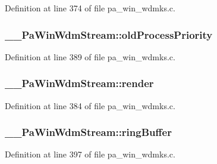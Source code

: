 Definition at line 374 of file pa\+\_\+win\+\_\+wdmks.\+c.

\subsubsection[{\texorpdfstring{old\+Process\+Priority}{oldProcessPriority}}]{ \+\_\+\+\_\+\+Pa\+Win\+Wdm\+Stream\+::old\+Process\+Priority}\hypertarget{struct_____pa_win_wdm_stream_a0ab2edba0df711bbda00f8030f290db0}{}\label{struct_____pa_win_wdm_stream_a0ab2edba0df711bbda00f8030f290db0}


Definition at line 389 of file pa\+\_\+win\+\_\+wdmks.\+c.

\subsubsection[{\texorpdfstring{render}{render}}]{ \+\_\+\+\_\+\+Pa\+Win\+Wdm\+Stream\+::render}\hypertarget{struct_____pa_win_wdm_stream_a29a9901256d26f88976f259bac0605e8}{}\label{struct_____pa_win_wdm_stream_a29a9901256d26f88976f259bac0605e8}


Definition at line 384 of file pa\+\_\+win\+\_\+wdmks.\+c.

\subsubsection[{\texorpdfstring{ring\+Buffer}{ringBuffer}}]{ \+\_\+\+\_\+\+Pa\+Win\+Wdm\+Stream\+::ring\+Buffer}\hypertarget{struct_____pa_win_wdm_stream_adece2546e5f0f11c92aa5ddd757bc251}{}\label{struct_____pa_win_wdm_stream_adece2546e5f0f11c92aa5ddd757bc251}


Definition at line 397 of file pa\+\_\+win\+\_\+wdmks.\+c.

